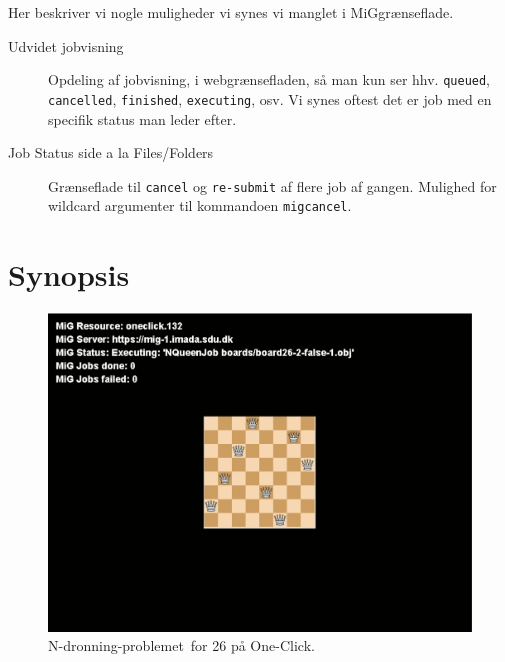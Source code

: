 \documentclass[draft,a4paper,11pt]{article}
\newcommand{\mig}{MiG}
\newcommand{\oc}{One-Click}
\newcommand{\nq}{N-dronning-problemet}
\begin{document}
Her beskriver vi nogle muligheder vi synes vi manglet i \mig grænseflade.
\begin{description}
	\item[Udvidet jobvisning]
	Opdeling af jobvisning, i webgrænsefladen, så man kun ser hhv. \texttt{queued}, \texttt{cancelled}, \texttt{finished}, \texttt{executing}, osv. Vi synes oftest det er job med en specifik status man leder efter.
	\item[Job Status side a la Files/Folders] 
	Grænseflade til \texttt{cancel} og \texttt{re-submit} af flere job af gangen. Mulighed for wildcard argumenter til kommandoen \texttt{migcancel}.
\end{description}



%





\appendix

\newpage
\section{Synopsis}


\begin{landscape}
\begin{figure}
\includegraphics{actionshot.pdf}
\caption{\nq\ for 26 på \oc.}
\label{fig:action}
\end{figure}
\end{landscape}
\end{document}
